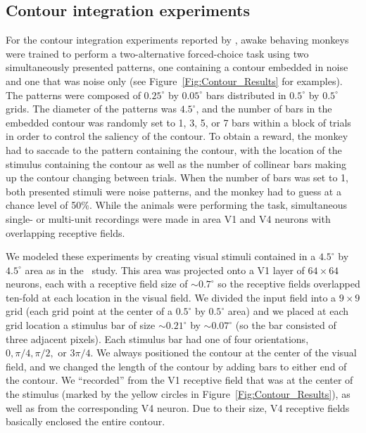 {\subsection{Contour integration experiments} 
\label{sec:contour_exp}
For the contour integration experiments reported by
\cite{Chen_etal14}, awake behaving
 monkeys were trained to perform a two-alternative
forced-choice task using two simultaneously presented patterns, one
containing a contour embedded in noise and one that was noise only
(see Figure~\ref{Fig:Contour_Results} for examples). 
The patterns
were composed of 
$0.25^{\circ}$ by $0.05^{\circ}$
bars distributed in $0.5^{\circ}$ by $0.5^{\circ}$ grids. 
The diameter
of the patterns was $4.5^{\circ}$, and the number of bars in the
embedded contour was randomly set to 1, 3, 5, or 7 bars within a block
of trials in order to control the saliency of the contour.
To obtain a reward, the
monkey had to saccade to the pattern containing the contour, 
with the location of the stimulus containing the contour as well as the number
of collinear bars making up the contour  changing between trials. 
 When the number of bars was set to 1, both presented stimuli were noise patterns, and the monkey had to guess at a chance level of 50\%. 
 While the animals were performing the task, simultaneous
single- or multi-unit recordings were made in area V1 and V4 neurons with
overlapping receptive fields. 

We modeled these experiments by creating visual stimuli
contained in a $4.5^{\circ}$ by $4.5^{\circ}$ area
as in the~\cite{Chen_etal14}  study. This area was projected onto
a V1 layer of $64 \times 64$ neurons, each with a receptive field
size of $\sim0.7^{\circ}$  
so the receptive fields overlapped ten-fold at each location in the visual
field. 
We divided the input field into a $9 \times 9$ grid (each grid point
at the center of a $0.5^{\circ}$ by $0.5^{\circ}$ area)
and we placed at each grid location a
stimulus bar of size $\sim0.21^{\circ}$ by $\sim0.07^{\circ}$ 
(so the bar consisted of three adjacent pixels).
Each stimulus bar had one of four orientations, 
$0, \pi/4, \pi/2,$ or $3\pi/4$. 
We always positioned the
contour at the center of the  
visual field,
and we changed the length of the
contour by adding bars to either end 
 of the contour. We
``recorded'' from the V1 receptive field that was at the center of the
stimulus (marked by the yellow circles in Figure~\ref{Fig:Contour_Results}),
as well as from the corresponding V4 neuron.
Due to their size, V4 receptive fields
basically enclosed the entire
contour.

}
